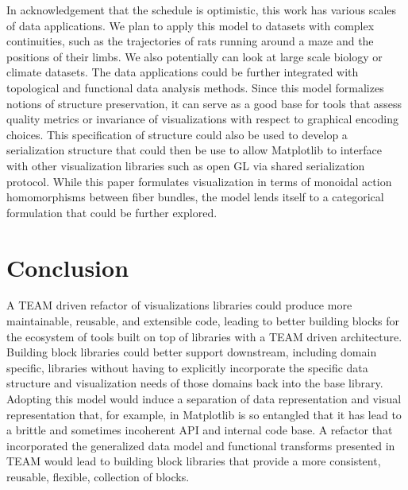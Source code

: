 \documentclass[../main.tex]{subfiles}
\begin{document}
In acknowledgement that the schedule is optimistic, this work has various scales of data applications. We plan to apply this model to datasets with complex continuities, such as the trajectories of rats running around a maze and the positions of their limbs. We also potentially can look at large scale biology or climate datasets. The data applications could be further integrated with topological \cite{heineSurveyTopologybasedMethods2016} and functional \cite{ramsayFunctionalDataAnalysis2006a} data analysis methods. Since this model formalizes notions of structure preservation, it can serve as a good base for tools that assess quality metrics \cite{bertiniQualityMetricsHighdimensional2011a} or invariance \cite{kindlmannAlgebraicProcessVisualization2014} of visualizations with respect to graphical encoding choices. This specification of structure could also be used to develop a serialization structure that could then be use to allow Matplotlib to interface with other visualization libraries such as open GL via shared serialization protocol. While this paper formulates visualization in terms of monoidal action homomorphisms between fiber bundles, the model lends itself to a categorical formulation \cite{fongInvitationAppliedCategory2019,milewskiCategoryTheoryProgrammers} that could be further explored.  

\section{Conclusion}
A TEAM driven refactor of visualizations libraries could produce more maintainable, reusable, and extensible code, leading to better building blocks for the ecosystem of tools built on top of libraries with a TEAM driven architecture. Building block libraries could better support downstream, including domain specific, libraries without having to explicitly incorporate the specific data structure and visualization needs of those domains back into the base library. Adopting this model would induce a separation of data representation and visual representation that, for example, in Matplotlib is so entangled that it has lead to a brittle and sometimes incoherent API and internal code base. A refactor that incorporated the generalized data model and functional transforms presented in TEAM would lead to building block libraries that provide a more consistent, reusable, flexible, collection of blocks. 
\end{document}
